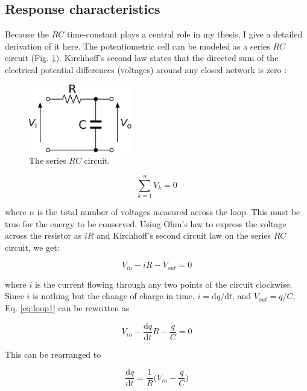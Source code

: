 		\subsection{Response characteristics}
Because the $RC$ time-constant plays a central role in my thesis, I give a detailed derivation of it here.
The potentiometric cell can be modeled as a series $RC$ circuit (Fig. \ref{fig:rc}).
Kirchhoff's second law states that the directed sum of the electrical potential differences (voltages) around any closed network is zero \cite{hill2015art}:

\begin{figure}
\centering
\includegraphics[width=0.4\textwidth]{img/theory/rc.eps}
\caption{The series $RC$ circuit.}
\label{fig:rc}
\end{figure}

\begin{equation}
\label{eq:kirchoff}
	\sum_{k=1}^{n} V_k = 0
\end{equation}

where $n$ is the total number of voltages measured across the loop.
This must be true for the energy to be conserved.
Using Ohm's law to express the voltage across the resistor as $iR$ and Kirchhoff's second circuit law on the series $RC$ circuit, we get:

\begin{equation}
\label{eq:loop1}
	V_{in} - iR - V_{out} = 0
\end{equation}

where $i$ is the current flowing through any two points of the circuit clockwise.
Since $i$ is nothing but the change of charge in time, $i = \mathrm{d}q / \mathrm{d}t$, and $V_{out} = q / C$, Eq. \ref{eq:loop1} can be rewritten as

\begin{equation}
\label{eq:loop2}
        V_{in} - \frac{\mathrm{d}q}{\mathrm{d}t}R - \frac{q}{C} = 0
\end{equation}

This can be rearranged to

\begin{equation}
\label{eq:loop3}
        \frac{\mathrm{d}q}{\mathrm{d}t} = \frac{1}{R}\bigg(V_{in} - \frac{q}{C}\bigg)
\end{equation}

